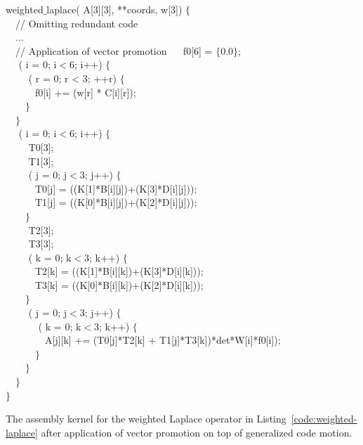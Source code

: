 \begin{algorithm}
\scriptsize\ttfamily
{}
 weighted$\_$laplace( A[3][3],  **coords,  w[3]) $\lbrace$\\
~~// Omitting redundant code \\
~~...\\
~~// Application of vector promotion
~~ f0[6] = $\lbrace$0.0$\rbrace$;\\
~~ ( i = 0; i$<$6; i++) $\lbrace$ \\
~~~~ ( r  = 0; r < 3; ++r) $\lbrace$ \\
~~~~~~f0[i] += (w[r] * C[i][r]);\\
~~~~$\rbrace$ \\
~~$\rbrace$\\
~~ ( i = 0; i$<$6; i++) $\lbrace$ \\
~~~~ T0[3];\\
~~~~ T1[3];\\
~~~~ ( j = 0; j$<$3; j++) $\lbrace$ \\
~~~~~~T0[j] = ((K[1]*B[i][j])+(K[3]*D[i][j]));\\
~~~~~~T1[j] = ((K[0]*B[i][j])+(K[2]*D[i][j]));\\
~~~~$\rbrace$\\
~~~~ T2[3];\\
~~~~ T3[3];\\
~~~~ ( k = 0; k$<$3; k++) $\lbrace$ \\
~~~~~~T2[k] = ((K[1]*B[i][k])+(K[3]*D[i][k]));\\
~~~~~~T3[k] = ((K[0]*B[i][k])+(K[2]*D[i][k]));\\
~~~~$\rbrace$\\
~~~~ ( j = 0; j$<$3; j++) $\lbrace$\\
~~~~~~ ( k = 0; k$<$3; k++) $\lbrace$\\
~~~~~~~~A[j][k] += (T0[j]*T2[k] + T1[j]*T3[k])*det*W[i]*f0[i]);\\
~~~~~~$\rbrace$\\
~~~~$\rbrace$\\
~~$\rbrace$\\
$\rbrace$

\caption{The assembly kernel for the weighted Laplace operator in Listing~\ref{code:weighted-laplace} after application of vector promotion on top of generalized code motion.}
\label{code:weighted-laplace-vector-prom}
\end{algorithm}

